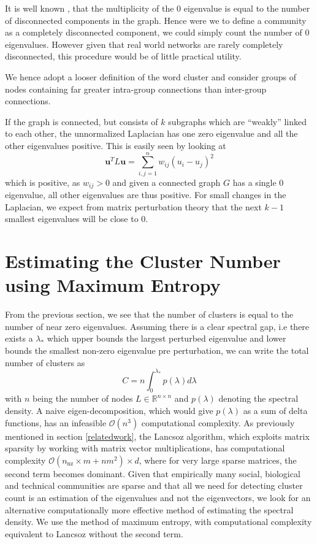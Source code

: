 \documentclass[letterpaper]{article} %
\begin{document}
It is well known \cite{von2007tutorial}, that the multiplicity of the $0$ eigenvalue is equal to the number of disconnected components in the graph. Hence were we to define a community as a completely disconnected component, we could simply count the number of $0$ eigenvalues. However given that real world networks are rarely completely disconnected, this procedure would be of little practical utility. 


We hence adopt a looser definition of the word cluster and consider groups of nodes containing far greater intra-group connections than inter-group connections. %

If the graph is connected, but consists of $k$ subgraphs which are ``weakly'' linked to each other, the unnormalized Laplacian has one zero eigenvalue and all the other eigenvalues positive. 
This is easily seen by looking at
\begin{equation}
\mathbf{u}^{T}L \mathbf{u} = \sum_{i,j=1}^{n}w_{ij}(u_{i}-u_{j})^{2}
\end{equation}
which is positive, as $w_{ij}>0$ and given a connected graph $G$ has a single $0$ eigenvalue, all other eigenvalues are thus positive. For small changes in the Laplacian, we expect from matrix perturbation theory \citep{bhatia2013matrix} that the next $k-1$ smallest eigenvalues will be close to $0$. 


\section{Estimating the Cluster Number using Maximum Entropy}

From the previous section, we see that the number of clusters is equal to the number of near zero eigenvalues. Assuming there is a clear spectral gap, i.e there exists a $\lambda_{*}$ which upper bounds the largest perturbed eigenvalue and lower bounds the smallest non-zero eigenvalue pre perturbation, we can write the total number of clusters as 
\begin{equation}
C = n\int_{0}^{\lambda_{*}} p(\lambda)d\lambda
\end{equation}
with $n$ being the number of nodes $L \in \mathbb{R}^{n\times n}$ and $p(\lambda)$ denoting the spectral density. A naive eigen-decomposition, which would give $p(\lambda)$ as a sum of delta functions, has an infeasible $\mathcal{O}(n^{3})$ computational complexity. As previously mentioned in section \ref{relatedwork}, the Lancsoz algorithm, which exploits matrix sparsity by working with matrix vector multiplications,  has computational complexity $\mathcal{O}(n_\mathrm{nz}\times m + nm^{2})\times d$, where for very large sparse matrices, the second term becomes dominant. Given that empirically many social, biological and technical communities are sparse and that all we need for detecting cluster count is an estimation of the eigenvalues and not the eigenvectors, we look for an alternative computationally more effective method of estimating the spectral density. We use the method of maximum entropy, with computational complexity equivalent to Lancsoz without the second term. 
\end{document}

